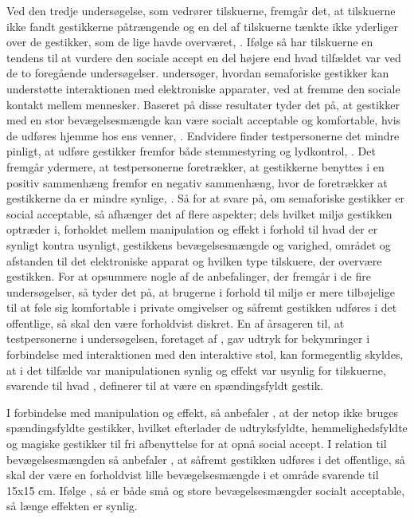 Ved den tredje undersøgelse, som vedrører tilskuerne, fremgår det, at tilskuerne ikke fandt gestikkerne påtrængende og en del af tilskuerne tænkte ikke yderliger over de gestikker, som de lige havde overværet, \parencite[s. 200]{PDF:AreYouComfortableDoingThat}. Ifølge \textcite[s. 200]{PDF:AreYouComfortableDoingThat} så har tilskuerne en tendens til at vurdere den sociale accept en del højere end hvad tilfældet var ved de to foregående undersøgelser. \blankline
%
\textcite{PDF:AnExploratoryStudy} undersøger, hvordan semaforiske gestikker kan understøtte interaktionen med elektroniske apparater, ved at fremme den sociale kontakt mellem mennesker. Baseret på disse resultater tyder det på, at gestikker med en stor bevægelsesmængde kan være socialt acceptable og komfortable, hvis de udføres hjemme hos ens venner, \parencite[s. 4]{PDF:AnExploratoryStudy}. Endvidere finder testpersonerne det mindre pinligt, at udføre gestikker fremfor både stemmestyring og lydkontrol, \parencite[s. 4]{PDF:AnExploratoryStudy}. Det fremgår ydermere, at testpersonerne foretrækker, at gestikkerne benyttes i en positiv sammenhæng fremfor en negativ sammenhæng, hvor de foretrækker at gestikkerne da er mindre synlige, \parencite[s. 4]{PDF:AnExploratoryStudy}. \blankline
%
Så for at svare på, om semaforiske gestikker er social acceptable, så afhænger det af flere aspekter; dels hvilket miljø gestikken optræder i, forholdet mellem manipulation og effekt i forhold til hvad der er synligt kontra usynligt, gestikkens bevægelsesmængde og varighed, området og afstanden til det elektroniske apparat og hvilken type tilskuere, der overvære gestikken. For at opsummere nogle af de anbefalinger, der fremgår i de fire undersøgelser, så tyder det på, at brugerne i forhold til miljø er mere tilbøjelige til at føle sig komfortable i private omgivelser og såfremt gestikken udføres i det offentlige, så skal den være forholdvist diskret. En af årsageren til, at testpersonerne i undersøgelsen, foretaget af \textcite[s. 4]{PDF:AChairAsUbiquitousInputDevice}, gav udtryk for bekymringer i forbindelse med interaktionen med den interaktive stol, kan formegentlig skyldes, at i det tilfælde var manipulationen synlig og effekt var usynlig for tilskuerne, svarende til hvad \textcite[s. 276]{PDF:WouldYouDoThat}, definerer til at være en spændingsfyldt gestik.  

I forbindelse med manipulation og effekt, så anbefaler \textcite[s. 278]{PDF:WouldYouDoThat}, at der netop ikke bruges spændingsfyldte gestikker, hvilket efterlader de udtryksfyldte, hemmelighedsfyldte og magiske gestikker til fri afbenyttelse for at opnå social accept. I relation til bevægelsesmængden så anbefaler \textcite[s. 201]{PDF:AreYouComfortableDoingThat}, at såfremt gestikken udføres i det offentlige, så skal der være en forholdvist lille bevægelsesmængde i et område svarende til 15x15 cm. Ifølge \textcite[s. 278]{PDF:WouldYouDoThat}, så er både små og store bevægelsesmængder socialt acceptable, så længe effekten er synlig.


